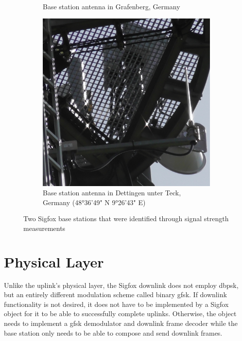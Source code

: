 \begin{figure}[h]
\begin{subfigure}[t]{0.31\textwidth}
	\caption{Base station antenna in Grafenberg, Germany}
\end{subfigure}
\hspace{0.02\textwidth}
\begin{subfigure}[t]{0.31\textwidth}
	\centering
	\includegraphics[width=\textwidth]{fig/antenna_dettingen.jpg}
	\caption{Base station antenna in Dettingen unter Teck, Germany (48°36'49" N \hspace{4pt} 9°26'43" E)}
\end{subfigure}
\caption{Two Sigfox base stations that were identified through signal strength measurements}
\label{fig:basestation_photo}
\end{figure}

\FloatBarrier
\section{Physical Layer}
Unlike the uplink's physical layer, the Sigfox downlink does not employ \gls{dbpsk}, but an entirely different modulation scheme called binary \gls{gfsk}.
If downlink functionality is not desired, it does not have to be implemented by a Sigfox object for it to be able to successfully complete uplinks.
Otherwise, the object needs to implement a \gls{gfsk} demodulator and downlink frame decoder while the base station only needs to be able to compose and send downlink frames.

